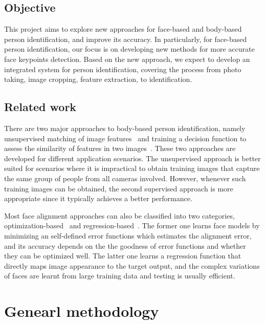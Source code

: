 \documentclass[pdftex,12pt,a4paper]{report}
\begin{document}
\section{Objective}
This project aims to explore new approaches for face-based and body-based person
identification, and improve its accuracy. In particularly, for face-based person
identification, our focus is on developing new methods for more accurate face
keypoints detection.
Based on the new approach, we expect
to develop an integrated system for person identification, covering the process
from photo taking, image cropping, feature extraction, to identification.

\section{Related work}
There are two major approaches to body-based person identification, namely unsupervised 
matching of image features~\cite{unsupervised_1, unsupervised_2,unsupervised_3} 
and training a decision function to assess the similarity of features in two
images~\cite{article_5,article_6,article_10}. 
These two approaches are developed for different application scenarios. The 
unsupervised approach is better suited for scenarios where it is impractical 
to obtain training images that capture the same group of people from all cameras 
involved. However, whenever such training images can be obtained, the second 
supervised approach is more appropriate since it typically achieves a better 
performance.

Most face alignment approaches can also be classified into two categories,
optimization-based~\cite{Matthews03activeappearance,saragih_goecke2007} and
regression-based~\cite{Cristinacce_boostedregression,so75978}. 
The former one learns face models by
minimizing an self-defined error functions which estimates the alignment error,
and its accuracy depends on the the goodness of error functions and whether they
can be optimized well. The latter one learns a regression function that directly
maps image appearance to the target output, and the complex variations of faces
are learnt from large training data and testing is usually efficient.


\chapter*{Genearl methodology}





\cleardoublepage
{}
{}


\end{document}
